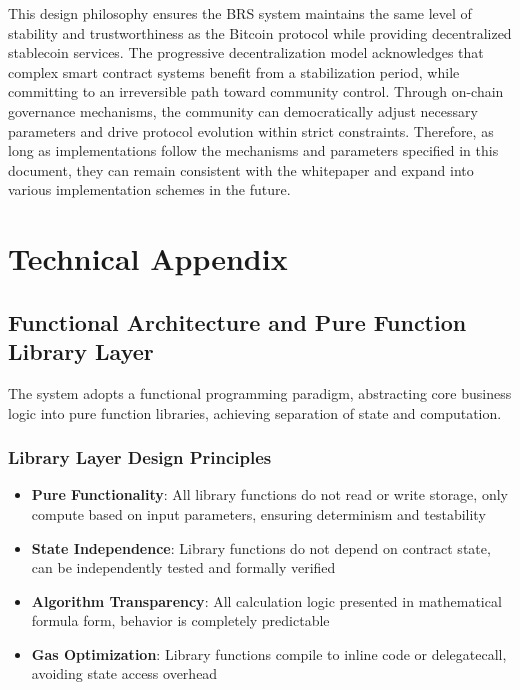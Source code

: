\documentclass{article}
\begin{document}
This design philosophy ensures the BRS system maintains the same level of stability and trustworthiness as the Bitcoin protocol while providing decentralized stablecoin services. The progressive decentralization model acknowledges that complex smart contract systems benefit from a stabilization period, while committing to an irreversible path toward community control. Through on-chain governance mechanisms, the community can democratically adjust necessary parameters and drive protocol evolution within strict constraints. Therefore, as long as implementations follow the mechanisms and parameters specified in this document, they can remain consistent with the whitepaper and expand into various implementation schemes in the future.

\appendix

\section{Technical Appendix}

\subsection{Functional Architecture and Pure Function Library Layer}

The system adopts a functional programming paradigm, abstracting core business logic into pure function libraries, achieving separation of state and computation.

\subsubsection{Library Layer Design Principles}
\begin{itemize}
  \item \textbf{Pure Functionality}: All library functions do not read or write storage, only compute based on input parameters, ensuring determinism and testability
  \item \textbf{State Independence}: Library functions do not depend on contract state, can be independently tested and formally verified
  \item \textbf{Algorithm Transparency}: All calculation logic presented in mathematical formula form, behavior is completely predictable
  \item \textbf{Gas Optimization}: Library functions compile to inline code or delegatecall, avoiding state access overhead
\end{itemize}
\end{document}
